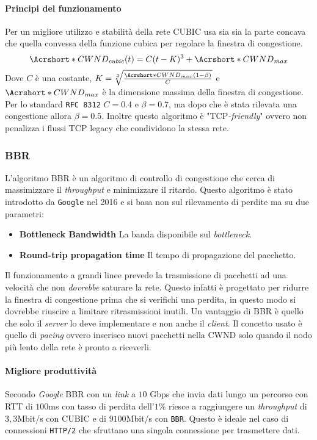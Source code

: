             \paragraph{Principi del funzionamento} Per un migliore utilizzo e stabilità della rete \Acrshort*{CUBIC} usa sia sia la parte concava che quella convessa della funzione cubica per regolare la finestra di congestione. 
            $$
                \Acrshort*{CWND}_{cubic}(t) = C(t-K)^3 + \Acrshort*{CWND}_{max}
            $$
            Dove $ C $ è una costante, $ K = \sqrt[3]{\frac{\Acrshort*{CWND}_{max}(1-\beta)}{C}} $ e $ \Acrshort*{CWND}_{max} $ è la dimensione massima della finestra di congestione. Per lo standard \texttt{\Acrshort*{RFC} 8312} $ C = 0.4 $ e $ \beta = 0.7 $, ma dopo che è stata rilevata una congestione allora $ \beta = 0.5 $. Inoltre questo algoritmo è "\Acrshort*{TCP}\textit{-friendly}" ovvero non penalizza i flussi \Acrshort*{TCP} legacy che condividono la stessa rete.
        \subsubsection{\Acrfull*{BBR}}
            L'algoritmo \Acrshort*{BBR} è un algoritmo di controllo di congestione che cerca di massimizzare il \textit{throughput} e minimizzare il ritardo. Questo algoritmo è stato introdotto da \texttt{Google} nel 2016 e si basa non sul rilevamento di perdite ma su due parametri: \begin{itemize}
                \item \textbf{Bottleneck Bandwidth} La banda disponibile sul \textit{bottleneck}.
                \item \textbf{Round-trip propagation time} Il tempo di propagazione del pacchetto.
            \end{itemize}
            Il funzionamento a grandi linee prevede la trasmissione di pacchetti ad una velocità che non \textit{dovrebbe} saturare la rete. Questo infatti è progettato per ridurre la finestra di congestione prima che si verifichi una perdita, in questo modo si dovrebbe riuscire a limitare ritrasmissioni inutili. Un vantaggio di \Acrshort*{BBR} è quello che solo il \textit{server} lo deve implementare e non anche il \textit{client}. Il concetto usato è quello di \textit{pacing} ovvero inserisco nuovi pacchetti nella \Acrshort*{CWND} solo quando il nodo più lento della rete è pronto a riceverli.
            \paragraph{Migliore produttività} Secondo \textit{Google} \Acrshort*{BBR} con un \textit{link} a $10$ Gbps che invia dati lungo un percorso con \Acrshort*{RTT} di $100$ms con tasso di perdita dell'$1\%$ riesce a raggiungere un \textit{throughput} di $3,3$Mbit/s con \Acrshort*{CUBIC} e di $9100$Mbit/s con \texttt{BBR}. Questo è ideale nel caso di connessioni \texttt{\Acrshort*{HTTP}/2} che sfruttano una singola connessione per trasmettere dati.
